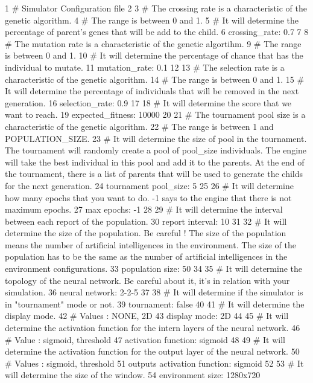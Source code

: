 \begin{DoxyCode}
1 # Simulator Configuration file
2 
3 # The crossing rate is a characteristic of the genetic algorithm.
4 # The range is between 0 and 1.
5 # It will determine the percentage of parent's genes that will be add to the child.
6 crossing\_rate: 0.7
7 
8 # The mutation rate is a characteristic of the genetic algortihm.
9 # The range is between 0 and 1.
10 # It will determine the percentage of chance that has the individual to mutate.
11 mutation\_rate: 0.1
12 
13 # The selection rate is a characteristic of the genetic algorithm.
14 # The range is between 0 and 1.
15 # It will determine the percentage of individuals that will be removed in the next generation.
16 selection\_rate: 0.9
17 
18 # It will determine the score that we want to reach.
19 expected\_fitness: 10000
20 
21 # The tournament pool size is a characteristic of the genetic algorithm.
22 # The range is between 1 and POPULATION\_SIZE.
23 # It will determine the size of pool in the tournament. The tournament will randomly create a pool of
       pool\_size individuals. The engine will take the best individual in this pool and add it to the parents. At the
       end of the tournament, there is a list of parents that will be used to generate the childs for the next
       generation.
24 tournament pool\_size: 5
25 
26 # It will determine how many epochs that you want to do. -1 says to the engine that there is not maximum
       epochs.
27 max epochs: -1
28 
29 # It will determine the interval between each report of the population.
30 report interval: 10
31 
32 # It will determine the size of the population. Be careful ! The size of the population means the number of
       artificial intelligences in the environment. The size of the population has to be the same as the number of
       artificial intelligences in the environment configurations.
33 population size: 50
34 
35 # It will determine the topology of the neural network. Be careful about it, it's in relation with your
       simulation.
36 neural network: 2-2-5
37 
38 # It will determine if the simulator is in "tournament" mode or not.
39 tournament: false
40 
41 # It will determine the display mode.
42 # Values : NONE, 2D
43 display mode: 2D
44 
45 # It will determine the activation function for the intern layers of the neural network.
46 # Value : sigmoid, threshold
47 activation function: sigmoid
48 
49 # It will determine the activation function for the output layer of the neural network.
50 # Values : sigmoid, threshold
51 outputs activation function: sigmoid
52 
53 # It will determine the size of the window.
54 environment size: 1280x720
\end{DoxyCode}


